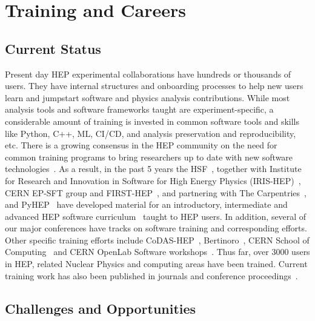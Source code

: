 \documentclass[10pt,a4paper]{article}
\begin{document}
\section{Training and Careers}\label{training-and-careers}

\subsection{Current Status}\label{current-status}

Present day HEP experimental collaborations have hundreds or thousands of users.
They have internal structures and onboarding processes to help new users learn
and jumpstart software and physics analysis contributions. While most analysis
tools and software frameworks taught are experiment-specific, a considerable
amount of training is invested in common software tools and skills like Python,
C++, ML, CI/CD, and analysis preservation and reproducibility, etc. There is a
growing consensus in the HEP community on the need for common training programs
to bring researchers up to date with new software
technologies~\cite{HSF-CWP-2017-02, Snowmass:2021_community_engagement_frontier, Snowmass:2021_CEF_report, Snowmass:2021_career_pipeline}.
As a result, in the past 5 years the HSF~\cite{HSFTraining}, together with Institute for
Research and Innovation in Software for High Energy Physics (IRIS-HEP)~\cite{IRISHEP:Training},
CERN EP-SFT group and FIRST-HEP~\cite{FIRST-HEP}, and partnering with The
Carpentries~\cite{TheCarpentries}, and PyHEP~\cite{HSFPyHEP} have developed material for an
introductory, intermediate and advanced HEP software curriculum~\cite{HSFTrainingCenter} taught
to HEP users. In addition, several of our major conferences have tracks on
software training and corresponding efforts. Other specific training efforts
include CoDAS-HEP~\cite{CODAS-HEP}, Bertinoro~\cite{INFN:ESC_school}, CERN School of
Computing~\cite{CERN:computing_school} and CERN OpenLab Software
workshops~\cite{CERN:SW_workshops}. Thus far,
over 3000 users in HEP, related Nuclear Physics and computing areas have been
trained. Current training work has also been published in journals and
conference proceedings~\cite{Malik:2919564, Malik:chep2023_training_outreach, Malik2021Software, 10.3389/fdata.2025.1497622}.

\subsection{Challenges and
Opportunities}\label{challenges-and-opportunities}
\end{document}
